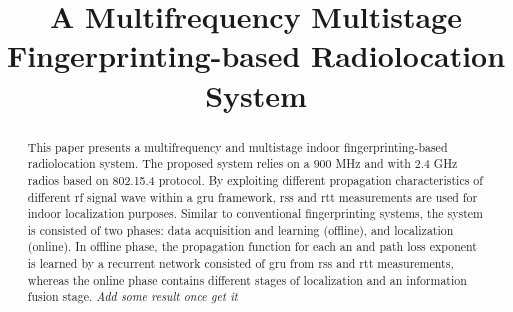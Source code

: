 \documentclass[conference]{IEEEtran}
\begin{document}
%
\title{A Multifrequency Multistage Fingerprinting-based Radiolocation System}


\author{
\and
{}
}

\maketitle

\begin{abstract}
    This paper presents a multifrequency and multistage indoor fingerprinting-based radiolocation system.
    The proposed system relies on a 900 MHz and with 2.4 GHz radios based on 802.15.4 protocol.
    By exploiting different propagation characteristics of different \gls{rf} signal wave within a \gls{gru} framework, \gls{rss} and \gls{rtt} measurements are used for indoor localization purposes.
    Similar to conventional fingerprinting systems, the system is consisted of two phases: data acquisition and learning (offline), and localization (online).
    In offline phase, the propagation function for each \gls{an} and path loss exponent is learned by a recurrent network consisted of \gls{gru} from \gls{rss} and \gls{rtt} measurements, whereas the online phase contains different stages of localization and an information fusion stage.
    \textit{Add some result once get it}
\end{abstract}
\end{document}
